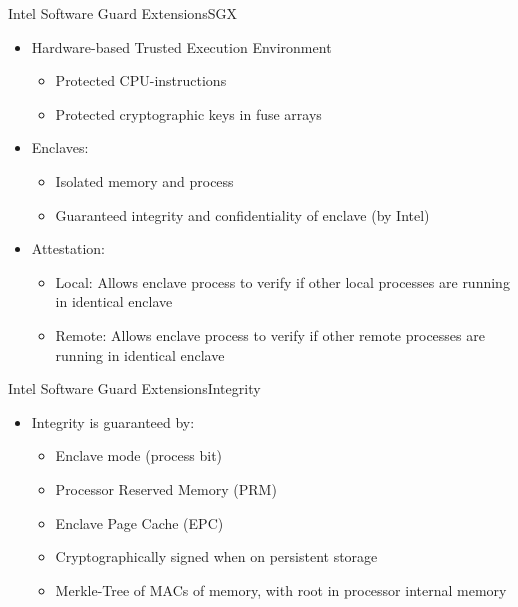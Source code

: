 \documentclass{beamer}
\begin{document}
\begin{frame}{Intel Software Guard Extensions}{SGX}%
	\begin{itemize}
		\item Hardware-based Trusted Execution Environment
		\begin{itemize}
			\item Protected CPU-instructions
			\item Protected cryptographic keys in fuse arrays
		\end{itemize}

		\vfill

		\item Enclaves:
		\begin{itemize}
			\item Isolated memory and process
			\item Guaranteed integrity and confidentiality of enclave (by Intel)
		\end{itemize}

		\vfill

		\item Attestation:
			\begin{itemize}
				\item Local: Allows enclave process to verify if other local processes are running in identical enclave
				\item Remote: Allows enclave process to verify if other remote processes are running in identical enclave
			\end{itemize}
	\end{itemize}
\end{frame}

\begin{frame}{Intel Software Guard Extensions}{Integrity}
    \begin{itemize}
    	\item Integrity is guaranteed by:

			\vfill
  			
    	\begin{itemize}
    		\item Enclave mode (process bit) %

  			\vfill
  			
    		\item Processor Reserved Memory (PRM)

  			\vfill
  			
    		\item Enclave Page Cache (EPC)

  			\vfill

    		\item Cryptographically signed when on persistent storage

  			\vfill
  			
    		\item Merkle-Tree of MACs of memory, with root in processor internal memory
    	\end{itemize}
    \end{itemize}
\end{frame}
\end{document}
